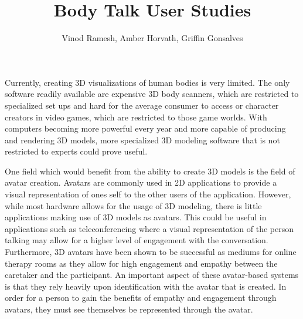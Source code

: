 \documentclass[journal]{vgtc}                %
\title{Body Talk User Studies}
\author{Vinod Ramesh, Amber Horvath, Griffin Gonsalves }
\begin{document}


\maketitle

\noindent Currently, creating 3D visualizations of human bodies is very limited. The only software readily available are expensive 3D body scanners, 
which are restricted to specialized set ups and hard for the average consumer to access or character creators in video games, which are restricted to 
those game worlds. With computers becoming more powerful every year and more capable of producing and rendering 3D models, more specialized 3D modeling
software that is not restricted to experts could prove useful. \newline

\noindent One field which would benefit from the ability to create 3D models is the field
of avatar creation. Avatars are commonly used in 2D applications to provide a visual representation of ones self to the other users of the application.
However, while most hardware allows for the usage of 3D modeling, there is little applications making use of 3D models as avatars. This could be useful
in applications such as teleconferencing where a visual representation of the person talking may allow for a higher level of engagement with the
conversation. Furthermore, 3D avatars have been shown to be successful as mediums for online therapy rooms as they allow for high engagement
and empathy between the caretaker and the participant\cite{Rijn:2015:BJGC}. An important aspect of these avatar-based systems is that they rely
heavily upon identification with the avatar that is created. In order for a person to gain the benefits of empathy and engagement through avatars,
they must see themselves be represented through the avatar\cite{Belisle:2010:PM}. \newline
\end{document}
